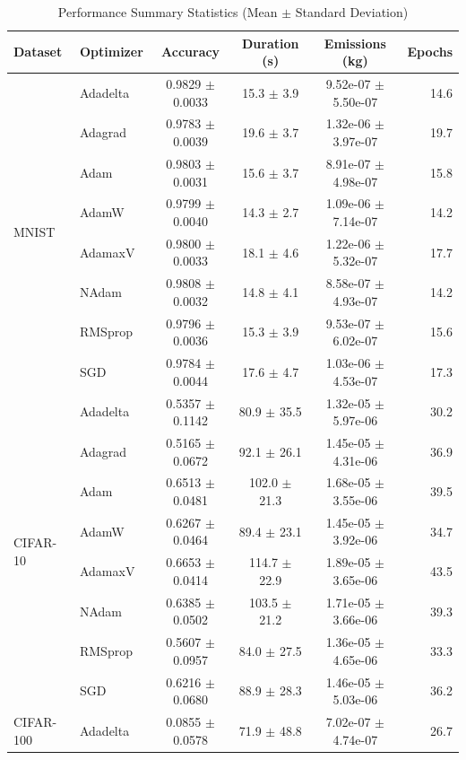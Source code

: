 \documentclass[conference]{IEEEtran}
\begin{document}
\begin{table}[htbp]
\centering
\caption{Performance Summary Statistics (Mean $\pm$ Standard Deviation)}
\label{tab:performance_summary}
\footnotesize
\begin{tabular}{@{}llcccr@{}}
\toprule
Dataset & Optimizer & Accuracy & Duration (s) & Emissions (kg) & Epochs \\
\midrule
\multirow{8}{*}{MNIST} 
& Adadelta & 0.9829 $\pm$ 0.0033 & 15.3 $\pm$ 3.9 & 9.52e-07 $\pm$ 5.50e-07 & 14.6 \\
& Adagrad & 0.9783 $\pm$ 0.0039 & 19.6 $\pm$ 3.7 & 1.32e-06 $\pm$ 3.97e-07 & 19.7 \\
& Adam & 0.9803 $\pm$ 0.0031 & 15.6 $\pm$ 3.7 & 8.91e-07 $\pm$ 4.98e-07 & 15.8 \\
& AdamW & 0.9799 $\pm$ 0.0040 & 14.3 $\pm$ 2.7 & 1.09e-06 $\pm$ 7.14e-07 & 14.2 \\
& AdamaxV & 0.9800 $\pm$ 0.0033 & 18.1 $\pm$ 4.6 & 1.22e-06 $\pm$ 5.32e-07 & 17.7 \\
& NAdam & 0.9808 $\pm$ 0.0032 & 14.8 $\pm$ 4.1 & 8.58e-07 $\pm$ 4.93e-07 & 14.2 \\
& RMSprop & 0.9796 $\pm$ 0.0036 & 15.3 $\pm$ 3.9 & 9.53e-07 $\pm$ 6.02e-07 & 15.6 \\
& SGD & 0.9784 $\pm$ 0.0044 & 17.6 $\pm$ 4.7 & 1.03e-06 $\pm$ 4.53e-07 & 17.3 \\
\midrule
\multirow{8}{*}{CIFAR-10}
& Adadelta & 0.5357 $\pm$ 0.1142 & 80.9 $\pm$ 35.5 & 1.32e-05 $\pm$ 5.97e-06 & 30.2 \\
& Adagrad & 0.5165 $\pm$ 0.0672 & 92.1 $\pm$ 26.1 & 1.45e-05 $\pm$ 4.31e-06 & 36.9 \\
& Adam & 0.6513 $\pm$ 0.0481 & 102.0 $\pm$ 21.3 & 1.68e-05 $\pm$ 3.55e-06 & 39.5 \\
& AdamW & 0.6267 $\pm$ 0.0464 & 89.4 $\pm$ 23.1 & 1.45e-05 $\pm$ 3.92e-06 & 34.7 \\
& AdamaxV & 0.6653 $\pm$ 0.0414 & 114.7 $\pm$ 22.9 & 1.89e-05 $\pm$ 3.65e-06 & 43.5 \\
& NAdam & 0.6385 $\pm$ 0.0502 & 103.5 $\pm$ 21.2 & 1.71e-05 $\pm$ 3.66e-06 & 39.3 \\
& RMSprop & 0.5607 $\pm$ 0.0957 & 84.0 $\pm$ 27.5 & 1.36e-05 $\pm$ 4.65e-06 & 33.3 \\
& SGD & 0.6216 $\pm$ 0.0680 & 88.9 $\pm$ 28.3 & 1.46e-05 $\pm$ 5.03e-06 & 36.2 \\
\midrule
\multirow{8}{*}{CIFAR-100}
& Adadelta & 0.0855 $\pm$ 0.0578 & 71.9 $\pm$ 48.8 & 7.02e-07 $\pm$ 4.74e-07 & 26.7 \\

\end{tabular}
\end{table}
\end{document}
